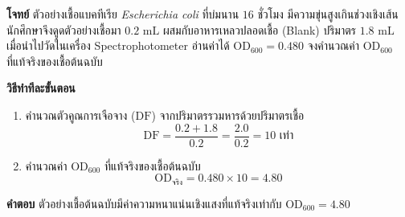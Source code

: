 \begin{worked}
\textbf{โจทย์} ตัวอย่างเชื้อแบคทีเรีย \textit{Escherichia coli} ที่บ่มนาน $16$ ชั่วโมง มีความขุ่นสูงเกินช่วงเชิงเส้น นักศึกษาจึงดูดตัวอย่างเชื้อมา $0.2\text{ mL}$ ผสมกับอาหารเหลวปลอดเชื้อ (Blank) ปริมาตร $1.8\text{ mL}$ เมื่อนำไปวัดในเครื่อง Spectrophotometer อ่านค่าได้ $\text{OD}_{600} = 0.480$ จงคำนวณค่า $\text{OD}_{600}$ ที่แท้จริงของเชื้อต้นฉบับ

\textbf{วิธีทำทีละขั้นตอน}
\begin{enumerate}
    \item คำนวณตัวคูณการเจือจาง ($\text{DF}$) จากปริมาตรรวมหารด้วยปริมาตรเชื้อ
    \begin{equation*}
        \text{DF} = \frac{0.2 + 1.8}{0.2} = \frac{2.0}{0.2} = 10\text{ เท่า}
    \end{equation*}
    \item คำนวณค่า $\text{OD}_{600}$ ที่แท้จริงของเชื้อต้นฉบับ
    \begin{equation*}
        \text{OD}_{\text{จริง}} = 0.480 \times 10 = 4.80
    \end{equation*}
\end{enumerate}
\textbf{คำตอบ} ตัวอย่างเชื้อต้นฉบับมีค่าความหนาแน่นเชิงแสงที่แท้จริงเท่ากับ $\text{OD}_{600} = 4.80$
\end{worked}

